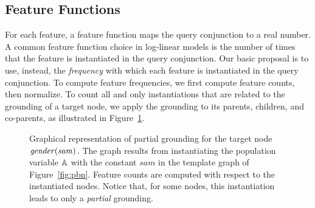 \documentclass[twoside,11pt]{article}
\newcommand{\point}[1]{\noindent\emph{#1}.}
\begin{document}


\subsection{Feature Functions} \label{sec:predictors}
For each feature, a feature function maps the query conjunction to a real number. A common feature function choice in log-linear models is the number of times that the feature is instantiated in the query conjunction. 
Our basic proposal is to use, instead, the {\em frequency} with which each feature
is instantiated in the query conjunction. 
%
To compute feature frequencies, we first compute feature counts, then normalize.
To count all and only instantiations that are related to the grounding of a target node, we apply the grounding to its parents, children, and co-parents, as illustrated in Figure~\ref{fig:regress}. 


\begin{figure}
\vspace{-0.5cm}
\begin{center}
\caption{Graphical representation of partial grounding for the target node $\it{gender}(sam)$. The graph results from instantiating the population variable $\mathbb{A}$ with the constant $sam$ in the template graph of Figure~\ref{fig:pbn}. Feature counts are computed with respect to the instantiated nodes. Notice that, for some nodes, this instantiation leads to only a {\em partial} grounding.
\label{fig:regress}}
\end{center}
\end{figure}
\end{document}
